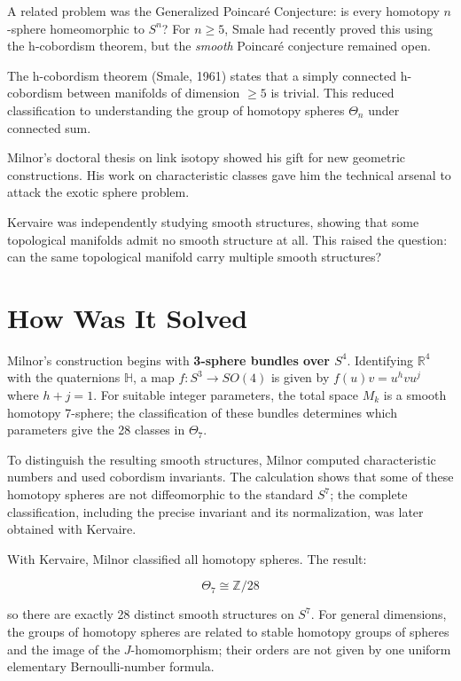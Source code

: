 A related problem was the Generalized Poincaré Conjecture: is every homotopy
$n$-sphere homeomorphic to $S^n$? For $n \geq 5$, Smale had recently proved this
using the h-cobordism theorem, but the \emph{smooth} Poincaré conjecture remained
open.

The h-cobordism theorem (Smale, 1961) states that a simply connected h-cobordism
between manifolds of dimension $\geq 5$ is trivial. This reduced classification to
understanding the group of homotopy spheres $\Theta_n$ under connected sum.

Milnor's doctoral thesis on link isotopy showed his gift for new geometric
constructions. His work on characteristic classes gave him the technical arsenal
to attack the exotic sphere problem.

Kervaire was independently studying smooth structures, showing that some
topological manifolds admit no smooth structure at all. This raised the question:
can the same topological manifold carry multiple smooth structures?

\section{How Was It Solved}

Milnor's construction begins with \textbf{3-sphere bundles over $S^4$}. Identifying
$\mathbb{R}^4$ with the quaternions $\mathbb{H}$, a map $f: S^3 \to SO(4)$ is
given by $f(u)v = u^h v u^j$ where $h + j = 1$. For suitable integer
parameters, the total space $M_k$ is a smooth homotopy 7-sphere; the
classification of these bundles determines which parameters give the 28
classes in $\Theta_7$.

To distinguish the resulting smooth structures, Milnor computed
characteristic numbers and used cobordism invariants. The calculation shows
that some of these homotopy spheres are not diffeomorphic to the standard
$S^7$; the complete classification, including the precise invariant and its
normalization, was later obtained with Kervaire.

With Kervaire, Milnor classified all homotopy spheres. The result:

\[\Theta_7 \cong \mathbb{Z}/28\]

so there are exactly 28 distinct smooth structures on $S^7$. For general
dimensions, the groups of homotopy spheres are related to stable homotopy
groups of spheres and the image of the $J$-homomorphism; their orders are not
given by one uniform elementary Bernoulli-number formula.

